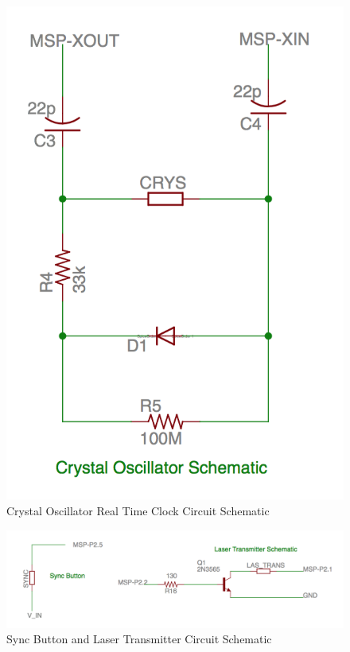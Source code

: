 \documentclass[letterpaper,10pt]{article}
\begin{document}
\begin{spacing}{1.15}
\begin{figure} [H]
	\centering
	\includegraphics[scale=0.35]{oscillator-schematic.png}
	\caption{Crystal Oscillator Real Time Clock Circuit Schematic\label{fig:crystal-oscillator-schematic}}
\end{figure}

\begin{figure} [H]
	\centering
	\includegraphics[scale=0.43]{transmitter-schematic.png}
	\caption{Sync Button and Laser Transmitter Circuit Schematic\label{fig:mcu-laser-schematic}}
\end{figure}


\end{spacing}
\end{document}
